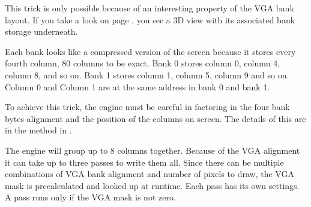 This trick is only possible because of an interesting property of the VGA bank layout. If you take a look on page \pageref{vga_layout}, you see a 3D view with its associated bank storage underneath.\\
\par
Each bank looks like a compressed version of the screen because it stores every fourth column, 80 columns to be exact. Bank 0 stores column 0, column 4, column 8, and so on. Bank 1 stores column 1, column 5, column 9 and so on. Column 0 and Column 1 are at the same address in bank 0 and bank 1.
 \par
  \begin{minipage}{\textwidth}
 

\centering
\vspace*{0.3cm}
\label{vga_layout}
\centering


 \end{minipage}

\par
\bigskip
To achieve this trick, the engine must be careful in factoring in the four bank bytes alignment and the position of the columns on screen. The details of this are in the method  in .\\
\par 
\begin{minipage}{\textwidth}

\end{minipage}
The engine will group up to 8 columns together. Because of the VGA alignment it can take up to three passes to write them all. Since there can be multiple combinations of VGA bank alignment and number of pixels to draw, the VGA mask is precalculated and looked up at runtime. Each pass has its own settings. A pass runs only if the VGA mask is not zero.\\


